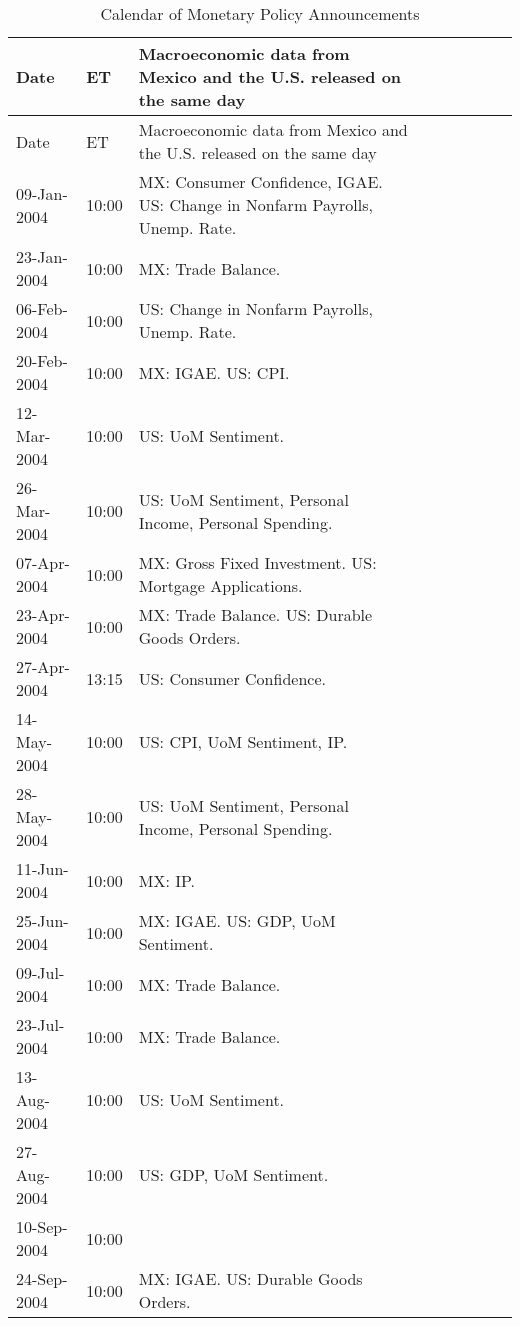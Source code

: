 \documentclass[a4paper,10pt]{article}
\begin{document}
\begin{tiny}
\begin{center}
\begin{longtable}{p{1.8cm}p{1cm}p{11.7cm}p{1.8cm}p{1cm}p{11.7cm}p{1.8cm}p{1cm}p{11.7cm}}
\caption{Calendar of Monetary Policy Announcements}
\label{tab:calendar}
\endfirsthead
\toprule
 Date & ET & Macroeconomic data from Mexico and the U.S. released on the same day \\
\midrule
\endhead
\bottomrule %
\endfoot
\endlastfoot
\toprule
 Date & ET & Macroeconomic data from Mexico and the U.S. released on the same day \\
\midrule
09-Jan-2004 & 10:00 & MX: Consumer Confidence, IGAE. US: Change in Nonfarm Payrolls, Unemp. Rate. \\
23-Jan-2004 & 10:00 & MX: Trade Balance. \\
06-Feb-2004 & 10:00 & US: Change in Nonfarm Payrolls, Unemp. Rate. \\
20-Feb-2004 & 10:00 & MX: IGAE. US: CPI. \\
12-Mar-2004 & 10:00 & US: UoM Sentiment. \\
26-Mar-2004 & 10:00 & US: UoM Sentiment, Personal Income, Personal Spending. \\
07-Apr-2004 & 10:00 & MX: Gross Fixed Investment. US: Mortgage Applications. \\
23-Apr-2004 & 10:00 & MX: Trade Balance. US: Durable Goods Orders. \\
27-Apr-2004 & 13:15 & US: Consumer Confidence. \\
14-May-2004 & 10:00 & US: CPI, UoM Sentiment, IP. \\
28-May-2004 & 10:00 & US: UoM Sentiment, Personal Income, Personal Spending. \\
11-Jun-2004 & 10:00 & MX: IP. \\
25-Jun-2004 & 10:00 & MX: IGAE. US: GDP, UoM Sentiment. \\
09-Jul-2004 & 10:00 & MX: Trade Balance. \\
23-Jul-2004 & 10:00 & MX: Trade Balance. \\
13-Aug-2004 & 10:00 & US: UoM Sentiment. \\
27-Aug-2004 & 10:00 & US: GDP, UoM Sentiment. \\
10-Sep-2004 & 10:00 &  \\
24-Sep-2004 & 10:00 & MX: IGAE. US: Durable Goods Orders. \\

\end{longtable}
\end{center}
\end{tiny}
\end{document}
